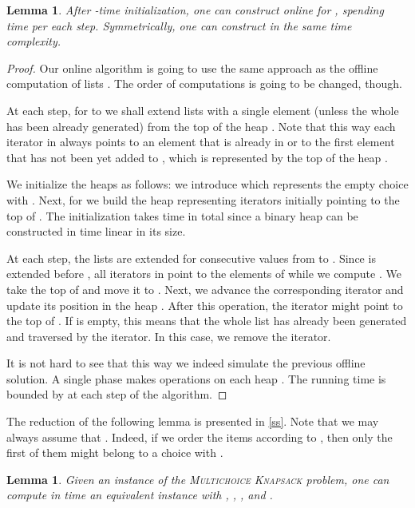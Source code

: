 \documentclass{article}
\theoremstyle{plain}
\newtheorem{lemma}[theorem]{Lemma}
\theoremstyle{definition}
\newcommand{\MK}{\textsc{Multichoice Knapsack}\xspace}
\begin{document}
  \begin{lemma}\label{lem:generate}
    After -time initialization, one can construct 
    online for , spending  time per each step.
    Symmetrically, one can construct  in the same time complexity.
  \end{lemma}
   \begin{proof}
      Our online algorithm is going to use the same approach as the offline computation of lists .
      The order of computations is going to be changed, though.
      
      At each step, for  to  we shall extend lists  with a single element 
      (unless the whole  has been already generated) from the top of the heap .
      Note that this way each iterator in  always points to an element 
      that is already in  or to the first element that has not been yet added to ,
      which is represented by the top of the heap . 
      
      We initialize the heaps as follows: we introduce  which represents the empty choice  with .
      Next, for  we build the heap  representing  iterators initially pointing to the top of .
      The initialization takes  time in total since a binary heap can be constructed in time linear in its size.
      
      At each step, the lists  are extended for consecutive values  from  to . 
      Since  is extended before , all iterators in  point to the elements of  while we compute .
      We take the top of  and move it to .
      Next, we advance the corresponding iterator and update its position in the heap .
      After this operation, the iterator might point to the top of .
      If  is empty, this means that the whole list  has already been generated and traversed by the iterator.
      In this case, we remove the iterator.
      
      It is not hard to see that this way we indeed simulate the previous offline solution.
      A single phase makes  operations on each heap .
      The running time is bounded by  at each step of the algorithm.
    \end{proof}

  
  
  The reduction of the following lemma is presented in \cref{ss}.
  Note that we may always assume that .
  Indeed, if we order the items  according to , 
  then only the first  of them might belong to a choice  with . 

\begin{lemma}\label{lem:knapred2}
    Given an instance  of the \MK problem, one can compute in  time
    an equivalent instance  with , ,
    , and .
    \end{lemma}
\end{document}
